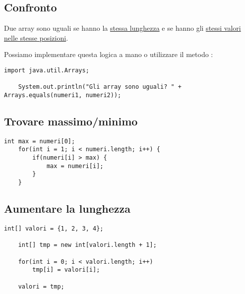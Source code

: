 \documentclass[../main.tex]{subfiles}
\begin{document}
\vspace{0.5cm}
\subsection{Confronto}
Due array sono uguali se hanno la \underline{stessa lunghezza} e se hanno gli \underline{stessi valori nelle stesse posizioni}.

Possiamo implementare questa logica a mano o utilizzare il metodo :
\begin{lstlisting}[style=java]
    import java.util.Arrays;

    System.out.println("Gli array sono uguali? " + Arrays.equals(numeri1, numeri2));
\end{lstlisting}

\pagebreak
\subsection{Trovare massimo/minimo}
\begin{lstlisting}[style=java]
    int max = numeri[0];
    for(int i = 1; i < numeri.length; i++) {
        if(numeri[i] > max) {
            max = numeri[i];
        }
    }
\end{lstlisting}

\vspace{0.5cm}
\subsection{Aumentare la lunghezza}
\begin{lstlisting}[style=java]
    int[] valori = {1, 2, 3, 4};

    int[] tmp = new int[valori.length + 1]; 

    for(int i = 0; i < valori.length; i++)
        tmp[i] = valori[i];

    valori = tmp;
\end{lstlisting}

\vspace{0.5cm}
\end{document}
